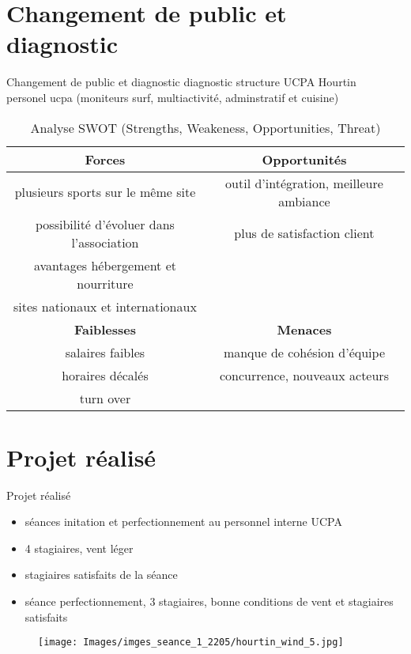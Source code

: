 \documentclass[10pt,a4paper]{beamer}
\begin{document}
\section{Changement de public et diagnostic}
\begin{frame}{Changement de public et diagnostic}
diagnostic structure UCPA Hourtin\\
personel ucpa (moniteurs surf, multiactivité, adminstratif et cuisine)
\small{
\begin{table}[h]
\centering
\begin{tabular}{|c|c|}
        \hline
        \textbf{Forces}                          & \textbf{Opportunités} \\ 
        \hline
        plusieurs sports sur le m\^eme site      &outil d'intégration, meilleure ambiance\\
        possibilité d'évoluer dans l'association & plus de satisfaction client  \\
        avantages hébergement et nourriture      &                              \\
        sites nationaux et internationaux        &                             \\
        \hline
        \textbf{Faiblesses}                      &  \textbf{Menaces} \\ 
        \hline
        salaires faibles                         & manque de cohésion d'équipe \\
        horaires décalés                         & concurrence, nouveaux acteurs   \\
        turn over                                &                               \\
        \hline
\end{tabular}
\caption{Analyse SWOT (Strengths, Weakeness, Opportunities, Threat)\label{swot}}
\end{table}}
\end{frame}



\section{Projet réalisé}
\begin{frame}{Projet réalisé}
\begin{itemize}
\item séances initation et perfectionnement au personnel interne UCPA
\item 4 stagiaires, vent léger
\item stagiaires satisfaits de la séance
\item séance perfectionnement, 3 stagiaires, bonne conditions de vent et stagiaires satisfaits
\end{itemize}
\begin{figure}
\texttt{[image: Images/imges\_seance\_1\_2205/hourtin\_wind\_5.jpg]} 
\end{figure}
\end{frame}
\end{document}
